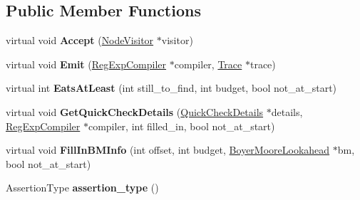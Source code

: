 \subsection*{Public Member Functions}
\begin{DoxyCompactItemize}
\item 
\hypertarget{classv8_1_1internal_1_1_assertion_node_a76eda020ebd409df34ec748dfbbc02bc}{}virtual void {\bfseries Accept} (\hyperlink{classv8_1_1internal_1_1_node_visitor}{Node\+Visitor} $\ast$visitor)\label{classv8_1_1internal_1_1_assertion_node_a76eda020ebd409df34ec748dfbbc02bc}

\item 
\hypertarget{classv8_1_1internal_1_1_assertion_node_a17e2a023a3d233b767f5222087e85672}{}virtual void {\bfseries Emit} (\hyperlink{classv8_1_1internal_1_1_reg_exp_compiler}{Reg\+Exp\+Compiler} $\ast$compiler, \hyperlink{classv8_1_1internal_1_1_trace}{Trace} $\ast$trace)\label{classv8_1_1internal_1_1_assertion_node_a17e2a023a3d233b767f5222087e85672}

\item 
\hypertarget{classv8_1_1internal_1_1_assertion_node_a1524215fa69f2427d08dc13c0bce27d1}{}virtual int {\bfseries Eats\+At\+Least} (int still\+\_\+to\+\_\+find, int budget, bool not\+\_\+at\+\_\+start)\label{classv8_1_1internal_1_1_assertion_node_a1524215fa69f2427d08dc13c0bce27d1}

\item 
\hypertarget{classv8_1_1internal_1_1_assertion_node_ad7ff94c39e2c1ce7660583e2d958c81f}{}virtual void {\bfseries Get\+Quick\+Check\+Details} (\hyperlink{classv8_1_1internal_1_1_quick_check_details}{Quick\+Check\+Details} $\ast$details, \hyperlink{classv8_1_1internal_1_1_reg_exp_compiler}{Reg\+Exp\+Compiler} $\ast$compiler, int filled\+\_\+in, bool not\+\_\+at\+\_\+start)\label{classv8_1_1internal_1_1_assertion_node_ad7ff94c39e2c1ce7660583e2d958c81f}

\item 
\hypertarget{classv8_1_1internal_1_1_assertion_node_a05b210612adc489b4749e6dcb99e8514}{}virtual void {\bfseries Fill\+In\+B\+M\+Info} (int offset, int budget, \hyperlink{classv8_1_1internal_1_1_boyer_moore_lookahead}{Boyer\+Moore\+Lookahead} $\ast$bm, bool not\+\_\+at\+\_\+start)\label{classv8_1_1internal_1_1_assertion_node_a05b210612adc489b4749e6dcb99e8514}

\item 
\hypertarget{classv8_1_1internal_1_1_assertion_node_a1c1279600bc32129daf91cb75c982e09}{}Assertion\+Type {\bfseries assertion\+\_\+type} ()\label{classv8_1_1internal_1_1_assertion_node_a1c1279600bc32129daf91cb75c982e09}

\end{DoxyCompactItemize}
